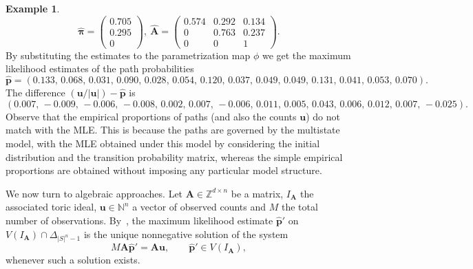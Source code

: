 \documentclass[11pt, a4paper]{article}
\numberwithin{equation}{section}
\theoremstyle{plain}
\theoremstyle{definition}
\newtheorem{example}{Example}
\begin{document}
\begin{example}
\[
\hat{\boldsymbol{\pi}} = \begin{pmatrix}
    0.705\\
    0.295\\
    0
\end{pmatrix} ,\
\hat{\textbf{A}} = \begin{pmatrix}
    0.574 &0.292& 0.134\\
     0  & 0.763 & 0.237\\
     0 & 0 & 1
\end{pmatrix}.
\]
By substituting the estimates to the parametrization map $\phi$ we get the maximum likelihood estimates of the path probabilities
\[
\hat{\textbf{p}} = (0.133,\, 0.068,\, 0.031,\, 0.090,\, 0.028,\, 0.054,\, 0.120,\, 0.037,\, 0.049,\, 0.049,\, 0.131,\, 0.041,\,  0.053,\, 0.070).
\]
The difference $({\textbf{u}}/{|\textbf{u}|}) - \hat{\textbf{p}}$ is
\[
(0.007,\,-0.009,\,-0.006,\,-0.008,\,0.002,\,0.007,\,-0.006,\,0.011,\,0.005,\,0.043,\,0.006,\,0.012,\,0.007,\,-0.025).
\]
Observe that the empirical proportions of paths (and also the counts $\textbf{u}$) do not match with the MLE.  This is because the paths are governed by the multistate model, with the MLE obtained under this model by considering the initial distribution and the transition probability matrix, whereas the simple empirical proportions are obtained without imposing any particular model structure. 



We now turn to algebraic approaches. 
Let $\textbf{A} \in \mathbb{Z}^{d \times n}$ be a matrix,
 $I_{\textbf{A}}$ the associated toric ideal, 
$\textbf{u} \in \mathbb{N}^n$ a vector of observed counts and $M$ the total number of observations.
By~\cite[Corollary 7.3.9]{sullivant2023algebraic}, the maximum likelihood estimate  $\hat{\textbf{p}}'$ on $V(I_{\textbf{A}}) \cap \Delta_{|S|^n-1}$ is the
unique nonnegative solution of the system
\begin{equation} \label{theorem_birch}
M \textbf{A} \hat{\textbf{p}}' = \textbf{A} \textbf{u},
\qquad
\hat{\textbf{p}}' \in V(I_{\textbf{A}}),
\end{equation}
whenever such a solution exists.


\end{example}
\end{document}
